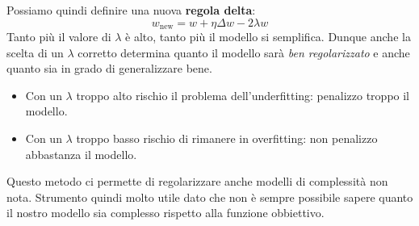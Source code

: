 Possiamo quindi definire una nuova \textbf{regola delta}:
\[ w_{\text{new}} = w + \eta \Delta w - 2 \lambda w \]
Tanto pi\`u il valore di $\lambda$ \`e alto, tanto pi\`u il modello si semplifica. Dunque anche la scelta di un
$\lambda$ corretto determina quanto il modello sar\`a \emph{ben regolarizzato} e anche quanto sia in grado di
generalizzare bene.

\begin{itemize}
	\item Con un $\lambda$ troppo alto rischio il problema dell'underfitting: penalizzo troppo il modello.
	\item Con un $\lambda$ troppo basso rischio di rimanere in overfitting: non penalizzo abbastanza il modello.
\end{itemize}

Questo metodo ci permette di regolarizzare anche modelli di complessit\`a non nota. Strumento quindi molto utile dato
che non \`e sempre possibile sapere quanto il nostro modello sia complesso rispetto alla funzione obbiettivo.

